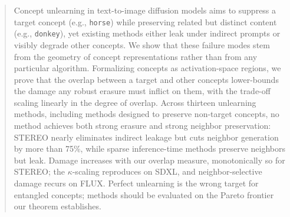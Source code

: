 \begin{abstract}
Concept unlearning in text-to-image diffusion models aims to suppress a target
concept (e.g., \texttt{horse}) while preserving related but distinct content
(e.g., \texttt{donkey}), yet existing methods either leak under indirect prompts
or visibly degrade other concepts. We show that these failure modes stem from the
geometry of concept representations rather than from any particular algorithm.
Formalizing concepts as activation-space regions, we prove that the overlap
between a target and other concepts lower-bounds the damage any robust erasure
must inflict on them, with the trade-off scaling linearly in the degree of
overlap. Across thirteen unlearning methods, including methods designed to
preserve non-target concepts, no method achieves both strong erasure and strong
neighbor preservation: STEREO nearly eliminates indirect leakage but cuts
neighbor generation by more than 75\%, while sparse inference-time methods
preserve neighbors but leak. Damage increases with our overlap measure,
monotonically so for STEREO; the $\kappa$-scaling reproduces on SDXL, and
neighbor-selective damage recurs on FLUX. Perfect unlearning is the wrong target
for entangled concepts; methods should be evaluated on the Pareto frontier our
theorem establishes.
\end{abstract}


